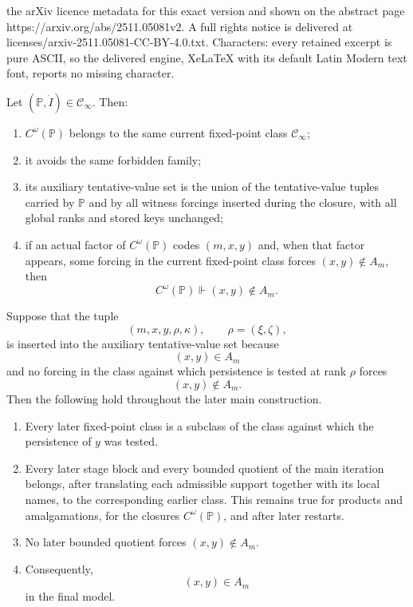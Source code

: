 \documentclass[10pt,a4paper]{amsart}
\newcommand{\forceP}{\mathbb{P}}
\begin{document}
the arXiv licence metadata for this exact version and shown on the abstract page https://arxiv.org/abs/2511.05081v2. A full rights notice is delivered at licenses/arxiv-2511.05081-CC-BY-4.0.txt. Characters: every retained excerpt is pure ASCII, so the delivered engine, XeLaTeX with its default Latin Modern text font, reports no missing character.
\begin{lemma}\label{UniformizationClosureLemma}
Let $(\forceP,\dot I)\in\mathcal C_\infty$. Then:
\begin{enumerate}
\item $C^\omega(\forceP)$ belongs to the same current fixed-point class $\mathcal C_\infty$;
\item it avoids the same forbidden family;
\item its auxiliary tentative-value set is the union of the tentative-value tuples carried by $\forceP$ and by all witness forcings inserted during the closure, with all global ranks and stored keys unchanged;
\item if an actual factor of $C^\omega(\forceP)$ codes $(m,x,y)$ and, when that factor appears, some forcing in the current fixed-point class forces $(x,y)\notin A_m$, then
\[
C^\omega(\forceP)\Vdash(x,y)\notin A_m.
\]
\end{enumerate}
\end{lemma}

\begin{lemma}\label{UniformizationPersistenceTailLemma}
Suppose that the tuple
\[
(m,x,y,\rho,\kappa),\qquad \rho=(\xi,\zeta),
\]
is inserted into the auxiliary tentative-value set because
\[
(x,y)\in A_m
\]
and no forcing in the class against which persistence is tested at rank $\rho$ forces
\[
(x,y)\notin A_m.
\]
Then the following hold throughout the later main construction.
\begin{enumerate}
\item Every later fixed-point class is a subclass of the class against which the persistence of $y$ was tested.
\item Every later stage block and every bounded quotient of the main iteration belongs, after translating each admissible support together with its local names, to the corresponding earlier class. This remains true for products and amalgamations, for the closures $C^\omega(\forceP)$, and after later restarts.
\item No later bounded quotient forces $(x,y)\notin A_m$.
\item Consequently,
\[
(x,y)\in A_m
\]
in the final model.
\end{enumerate}
\end{lemma}
\end{document}
